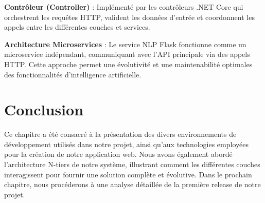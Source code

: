\noindent \textbf{Contrôleur (Controller)} : Implémenté par les contrôleurs .NET Core qui orchestrent les requêtes HTTP, valident les données d'entrée et coordonnent les appels entre les différentes couches et services.

\noindent \textbf{Architecture Microservices} : Le service NLP Flask fonctionne comme un microservice indépendant, communiquant avec l'API principale via des appels HTTP. Cette approche permet une évolutivité et une maintenabilité optimales des fonctionnalités d'intelligence artificielle.

\section*{Conclusion}

\noindent Ce chapitre a été consacré à la présentation des divers environnements de développement utilisés dans notre projet, ainsi qu'aux technologies employées pour la création de notre application web. Nous avons également abordé l'architecture N-tiers de notre système, illustrant comment les différentes couches interagissent pour fournir une solution complète et évolutive. Dans le prochain chapitre, nous procéderons à une analyse détaillée de la première release de notre projet.